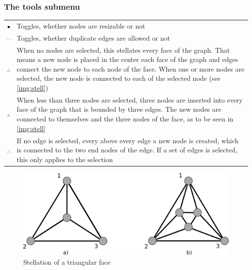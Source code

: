 \subsubsection{The tools submenu}
\begin{tabular}{p{}p{}}
\includegraphics[scale=0.6]{figures/icons/resize_nodes.png}& Toggles, whether nodes are resizable or not\\
\includegraphics[scale=0.6]{figures/icons/doubleEdges.png}& Toggles, whether duplicate edges are allowed or not\\
\includegraphics[scale=0.6]{figures/icons/stellation.png}& When no nodes are selected, this stellates every face of the graph. That means a new node is placed in the center each face of the graph and edges connect the new node to each node of the face. When one or more nodes are selected, the new node is connected to each of the selected node (see \autoref{img:stell})\\
\includegraphics[scale=0.6]{figures/icons/three_stellation.png}& When less than three nodes are selected, three nodes are inserted into every face of the graph that is bounded by three edges. The new nodes are connected to themselves and the three nodes of the face, as to be seen in \autoref{img:stell}\\
\includegraphics[scale=0.6]{figures/icons/edgeStellation.png}& If no edge is selected, every above every edge a new node is created, which is connected to the two end nodes of the edge. If a set of edges is selected, this only applies to the selection\\
\end{tabular}
\begin{figure}
\begin{center}
\includegraphics[width=\textwidth]{figures/figIndex/stellation.png}
\caption{Stellation of a triangular face}
\label{img:stell}
\end{center}
\end{figure}
